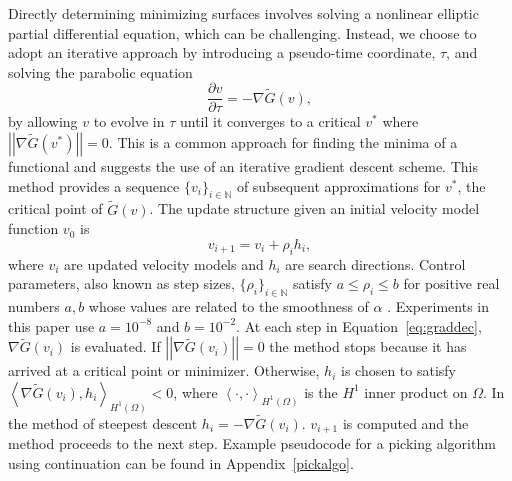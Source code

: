 Directly determining minimizing surfaces involves solving a nonlinear elliptic partial differential equation, which can be challenging.  Instead, we choose to adopt an iterative approach by introducing a pseudo-time coordinate, $\tau$, and solving the parabolic equation
\begin{equation}
\label{eq:pickingparabolic}
    \frac{\partial v}{\partial \tau} = -\nabla \tilde{G}(v),
\end{equation}
by allowing $v$ to evolve in $\tau$ until it converges to a critical $v^\ast$ where $\left|\left|\nabla \tilde{G}(v^\ast)\right|\right|=0$.  This is a common approach for finding the minima of a functional \cite[]{Mawhin2010OriginAE} and suggests the use of an iterative gradient descent scheme.  This method provides a sequence $\{v_i\}_{i\in\mathbb{N}}$ of subsequent approximations  for $v^\ast$, the critical point of $\tilde{G}(v)$.  The update structure given an initial velocity model function $v_0$ is 
\begin{equation}
    \label{eq:graddec}
    v_{i+1} = v_i + \rho_i h_i ,
\end{equation}
where $v_i$ are updated velocity models and $h_i$ are search directions. Control parameters, also known as step sizes, $\{\rho_i\}_{i\in\mathbb{N}}$ satisfy $a \leq \rho_i \leq b$ for positive real numbers $a,b$ whose values are related to the smoothness of $\alpha$ \cite[]{decker-dissertation}. Experiments in this paper use $a=10^{-8}$ and $b=10^{-2}$. At each step in Equation~\ref{eq:graddec}, $\nabla \tilde{G}(v_i)$ is evaluated.  If $\left|\left|\nabla \tilde{G}(v_i)\right|\right| = 0 $ the method stops because it has arrived at a critical point or minimizer.  Otherwise,  $h_i$ is chosen to satisfy $\left<\nabla \tilde{G}(v_i),h_i\right>_{H^1(\Omega)}<0$, where $\left< \cdot , \cdot \right>_{H^1(\Omega)}$ is the $H^1$ inner product on $\Omega$.  In the method of steepest descent $h_i = -\nabla \tilde{G}(v_i)$.  $v_{i+1}$ is computed and the method proceeds to the next step. Example pseudocode for a picking algorithm using continuation can be found in Appendix~\ref{pickalgo}.



